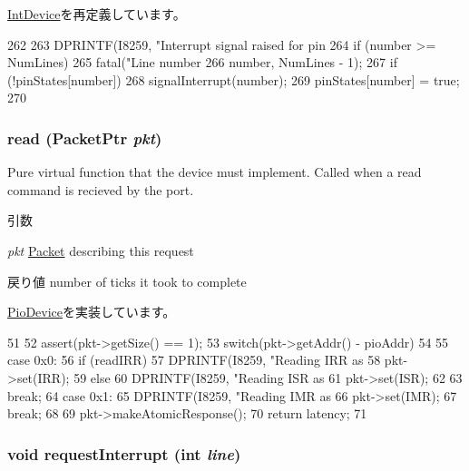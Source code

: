 \hyperlink{classX86ISA_1_1IntDevice_a4bafbbd02159d7bdc6eae7f4197db84f}{IntDevice}を再定義しています。


\begin{DoxyCode}
262 {
263     DPRINTF(I8259, "Interrupt signal raised for pin %
264     if (number >= NumLines)
265         fatal("Line number %
266                 number, NumLines - 1);
267     if (!pinStates[number])
268         signalInterrupt(number);
269     pinStates[number] = true;
270 }
\end{DoxyCode}
\hypertarget{classX86ISA_1_1I8259_a613ec7d5e1ec64f8d21fec78ae8e568e}{
\subsubsection[{read}]{ read ({\bf PacketPtr} {\em pkt})}}
\label{classX86ISA_1_1I8259_a613ec7d5e1ec64f8d21fec78ae8e568e}
Pure virtual function that the device must implement. Called when a read command is recieved by the port. 
\begin{DoxyParams}{引数}
\item[{\em pkt}]\hyperlink{classPacket}{Packet} describing this request \end{DoxyParams}
\begin{DoxyReturn}{戻り値}
number of ticks it took to complete 
\end{DoxyReturn}


\hyperlink{classPioDevice_a842312590432036092c422c87a442358}{PioDevice}を実装しています。


\begin{DoxyCode}
51 {
52     assert(pkt->getSize() == 1);
53     switch(pkt->getAddr() - pioAddr)
54     {
55       case 0x0:
56         if (readIRR) {
57             DPRINTF(I8259, "Reading IRR as %
58             pkt->set(IRR);
59         } else {
60             DPRINTF(I8259, "Reading ISR as %
61             pkt->set(ISR);
62         }
63         break;
64       case 0x1:
65         DPRINTF(I8259, "Reading IMR as %
66         pkt->set(IMR);
67         break;
68     }
69     pkt->makeAtomicResponse();
70     return latency;
71 }
\end{DoxyCode}
\hypertarget{classX86ISA_1_1I8259_a432db50d8e5302081e6d1dec35a7a963}{
\subsubsection[{requestInterrupt}]{\setlength{\rightskip}{0pt plus 5cm}void requestInterrupt (int {\em line})}}
\label{classX86ISA_1_1I8259_a432db50d8e5302081e6d1dec35a7a963}



